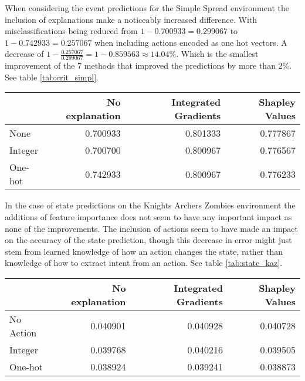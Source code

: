 \documentclass[UKenglish]{uiomasterthesis}
\begin{document}
When considering the event predictions for the Simple Spread environment the inclusion of explanations make a noticeably increased difference. With misclassifications being reduced from $1 - 0.700933 = 0.299067$ to $1-0.742933=0.257067$ when including actions encoded as one hot vectors. A decrease of $1 - \frac{0.257067}{0.299067} = 1 - 0.859563 \approx 14.04\%$. Which is the smallest improvement of the $7$ methods that improved the predictions by more than $2\%$. See table \ref{tab:crit_simpl}.

\begin{center}
\label{tab:crit_simpl}
\begin{tabular}{lrrr}
\toprule
 & No explanation & Integrated Gradients & Shapley Values \\
\midrule
    None & 0.700933 & 0.801333 & 0.777867 \\
    Integer & 0.700700 & 0.800967 & 0.776567 \\
    One-hot & 0.742933 & 0.800967 & 0.776233 \\
\bottomrule
\end{tabular}
\end{center}

In the case of state predictions on the Knights Archers Zombies environment the additions of feature importance does not seem to have any important impact as none of the improvements. The inclusion of actions seem to have made an impact on the accuracy of the state prediction, though this decrease in error might just stem from learned knowledge of how an action changes the state, rather than knowledge of how to extract intent from an action. See table \ref{tab:state_kaz}.

\begin{center}
\label{tab:state_kaz}
\begin{tabular}{lrrr}
\toprule
 & No explanation & Integrated Gradients & Shapley Values \\
\midrule
No Action & 0.040901 & 0.040928 & 0.040728 \\
Integer & 0.039768 & 0.040216 & 0.039505 \\
One-hot & 0.038924 & 0.039241 & 0.038873 \\
\bottomrule
\end{tabular}
\end{center}
\end{document}
